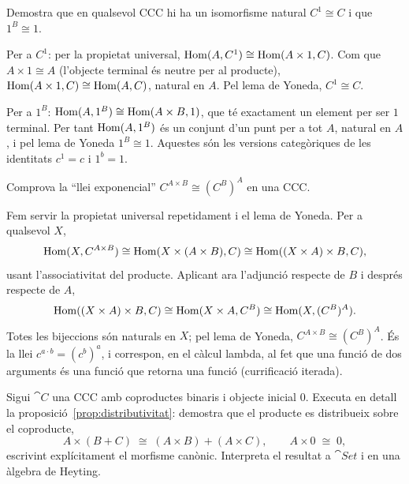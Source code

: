 \begin{exercici}
Demostra que en qualsevol CCC hi ha un isomorfisme natural $C^{1}\cong C$ i que $1^{B}\cong 1$.
\end{exercici}

\begin{solucio}
Per a $C^{1}$: per la propietat universal, $\operatorname{Hom}(A,C^{1})\cong\operatorname{Hom}(A\times 1,C)$. Com que $A\times 1\cong A$ (l'objecte terminal és neutre per al producte), $\operatorname{Hom}(A\times 1,C)\cong\operatorname{Hom}(A,C)$, natural en $A$. Pel lema de Yoneda, $C^{1}\cong C$.

Per a $1^{B}$: $\operatorname{Hom}(A,1^{B})\cong\operatorname{Hom}(A\times B,1)$, que té exactament un element per ser $1$ terminal. Per tant $\operatorname{Hom}(A,1^{B})$ és un conjunt d'un punt per a tot $A$, natural en $A$, i pel lema de Yoneda $1^{B}\cong 1$. Aquestes són les versions categòriques de les identitats $c^{1}=c$ i $1^{b}=1$.
\end{solucio}

\begin{exercici}
Comprova la \enquote{llei exponencial} $C^{A\times B}\cong(C^{B})^{A}$ en una CCC.
\end{exercici}

\begin{solucio}
Fem servir la propietat universal repetidament i el lema de Yoneda. Per a qualsevol $X$,
\[
\operatorname{Hom}(X,C^{A\times B})\cong\operatorname{Hom}(X\times(A\times B),C)\cong\operatorname{Hom}((X\times A)\times B,C),
\]
usant l'associativitat del producte. Aplicant ara l'adjunció respecte de $B$ i després respecte de $A$,
\[
\operatorname{Hom}((X\times A)\times B,C)\cong\operatorname{Hom}(X\times A,C^{B})\cong\operatorname{Hom}(X,(C^{B})^{A}).
\]
Totes les bijeccions són naturals en $X$; pel lema de Yoneda, $C^{A\times B}\cong(C^{B})^{A}$. És la llei $c^{a\cdot b}=(c^{b})^{a}$, i correspon, en el càlcul lambda, al fet que una funció de dos arguments és una funció que retorna una funció (currificació iterada).
\end{solucio}

\begin{exercici}\label{pr-distributivitat}
Sigui $\cat{C}$ una CCC amb coproductes binaris i objecte inicial $0$. Executa en detall la proposició~\ref{prop:distributivitat}: demostra que el producte es distribueix sobre el coproducte,
\[
A\times(B+C)\;\cong\;(A\times B)+(A\times C),
\qquad
A\times 0\;\cong\;0,
\]
escrivint explícitament el morfisme canònic. Interpreta el resultat a $\cat{Set}$ i en una àlgebra de Heyting.
\end{exercici}

